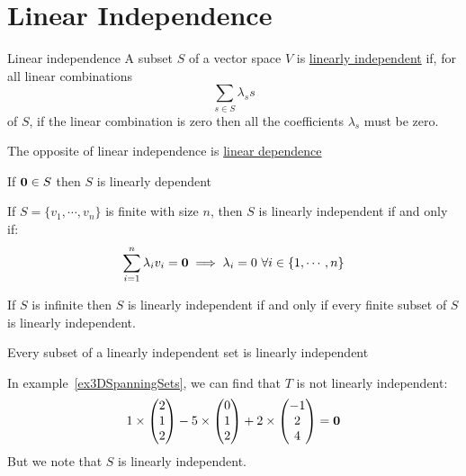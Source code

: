\documentclass[../Main.tex]{subfiles}
\begin{document}
\section{Linear Independence}
\begin{definition}{Linear independence}
    A subset $S$ of a vector space $V$ is \underline{linearly independent} if, for all linear combinations
    \begin{equation*}
        \sum_{s \in S} \lambda_s s
    \end{equation*}
    of $S$, if the linear combination is zero then all the coefficients $\lambda_s$ must be zero.
\end{definition}
\begin{remarks}
    \item The opposite of linear independence is \underline{linear dependence}
    \item If $\boldsymbol{0} \in S$ then $S$ is linearly dependent
    \item If $S = \{v_1, \cdots, v_n\}$ is finite with size $n$, then $S$ is linearly independent if and only if:
        \begin{equation*}
            \sum_{i = 1}^n \lambda_i v_i = \boldsymbol{0} \implies \lambda_i = 0~\forall i \in \{1, \cdots, n\}
        \end{equation*}
    \item If $S$ is infinite then $S$ is linearly independent if and only if every finite subset of $S$ is linearly independent.
    \item Every subset of a linearly independent set is linearly independent
\end{remarks}
\begin{example}
    In example~\ref{ex3DSpanningSets}, we can find that $T$ is not linearly independent:
    \begin{equation*}
        1 \times \begin{pmatrix} 2 \\ 1 \\ 2\end{pmatrix} - 5 \times \begin{pmatrix}0 \\ 1 \\ 2\end{pmatrix} + 2 \times \begin{pmatrix}-1 \\ 2 \\ 4\end{pmatrix} = \boldsymbol{0}
    \end{equation*}
    But we note that $S$ is linearly independent.
\end{example}
\end{document}
